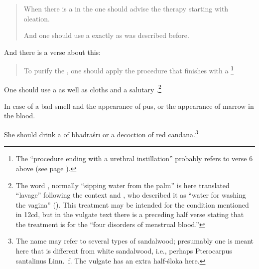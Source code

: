 \begin{translation}
\item[10.add4]

\begin{quote}   
   When there is a  in the 
   one should advise the therapy starting with oleation.
   
   And one should use a  exactly as was 
   described before.
   \end{quote}
%
%
\item[10.add5]
\item[10.add6]
\item[10.add7]
\item[10.add8]
\item[10.add9]
\item[10.add10]
\item[10.add11]
%
%

   \item [12cd]
   
And there is a verse about this:
\begin{quote}
     To purify the , one should apply the procedure 
    that finishes with a \footnote{The
        “procedure ending with a urethral instillation” probably refers to verse
        6 above (see page \pageref{uttarabastyantam}).}
\end{quote}   
    
 \item[13cd]  
 
 One should use a  as well as cloths and a salutary
.\footnote{The word , normally
    “sipping water from the palm” is here translated “lavage” following the
    context and , who described it as “water for
    washing the vagina” ().  This treatment may be
    intended for the condition mentioned in 12cd, but in the vulgate text
    there is a preceding half verse stating that the treatment is for the
    “four disorders of menstrual blood.”}
    
\item[14cd]

In case of a bad smell and the appearance of pus, or the appearance of
marrow in the blood.

\item [15]
\label{3.2.15}

She should drink a  of \gls{bhadraśrī} or a
decoction of red \gls{candana}.\footnote{The name  may
    refer to several types of sandalwood; presumably one is meant here
    that is different from white sandalwood, i.e., perhaps Pterocarpus
    santalinus Linn.\ f.  The vulgate has an extra half-śloka here.}
 

\end{translation}
